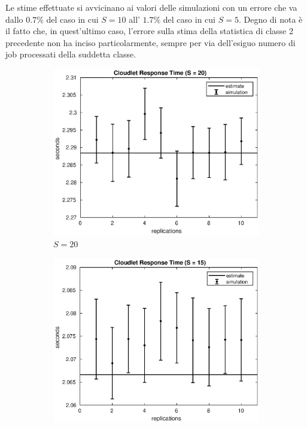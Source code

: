 Le stime effettuate si avvicinano ai valori delle simulazioni con un errore che
va dallo $0.7\%$ del caso in cui $S=10$ all' $1.7\%$ del caso in cui $S=5$.
Degno di nota è il fatto che, in quest'ultimo caso, l'errore sulla stima della
statistica di classe 2 precedente non ha inciso particolarmente, sempre
per via dell'esiguo numero di job processati della suddetta classe.
\begin{figure}[!h]
\centering
%
\begin{subfigure}[t]{0.49\textwidth}
\includegraphics[width=\textwidth]{figures/simul/20_500K_sclet}
\caption{$S = 20$}
\label{20_sclet}
\end{subfigure}
%
\begin{subfigure}[t]{0.49\textwidth}
\includegraphics[width=\textwidth]{figures/simul/15_500K_sclet}

\end{subfigure}
\end{figure}
